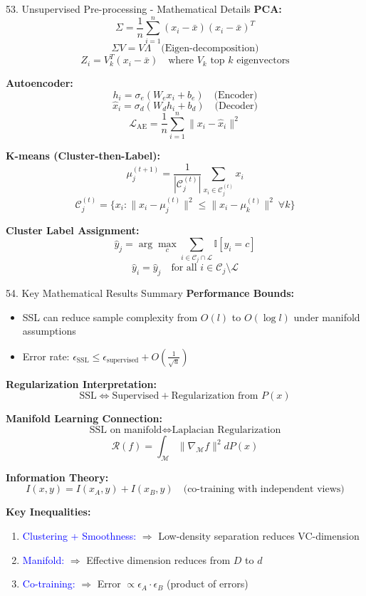 \documentclass[8pt]{beamer}
\begin{document}
	\begin{frame}{53. Unsupervised Pre-processing - Mathematical Details}
		\fontsize{6.5}{7.5}\selectfont
		\textbf{PCA:}
		\[
		\Sigma = \frac{1}{n} \sum_{i=1}^n (x_i - \bar{x})(x_i - \bar{x})^T
		\]
		\[
		\Sigma V = V \Lambda \quad \text{(Eigen-decomposition)}
		\]
		\[
		Z_i = V_k^T (x_i - \bar{x}) \quad \text{where } V_k \text{ top } k \text{ eigenvectors}
		\]
		
		\textbf{Autoencoder:}
		\[
		h_i = \sigma_e(W_e x_i + b_e) \quad \text{(Encoder)}
		\]
		\[
		\hat{x}_i = \sigma_d(W_d h_i + b_d) \quad \text{(Decoder)}
		\]
		\[
		\mathcal{L}_{\text{AE}} = \frac{1}{n} \sum_{i=1}^n \|x_i - \hat{x}_i\|^2
		\]
		
		\textbf{K-means (Cluster-then-Label):}
		\[
		\mu_j^{(t+1)} = \frac{1}{|\mathcal{C}_j^{(t)}|} \sum_{x_i \in \mathcal{C}_j^{(t)}} x_i
		\]
		\[
		\mathcal{C}_j^{(t)} = \{x_i : \|x_i - \mu_j^{(t)}\|^2 \leq \|x_i - \mu_k^{(t)}\|^2 \ \forall k\}
		\]
		
		\textbf{Cluster Label Assignment:}
		\[
		\hat{y}_j = \arg\max_c \sum_{i \in \mathcal{C}_j \cap \mathcal{L}} \mathbb{I}[y_i = c]
		\]
		\[
		\hat{y}_i = \hat{y}_j \quad \text{for all } i \in \mathcal{C}_j \setminus \mathcal{L}
		\]
	\end{frame}
	
	\begin{frame}{54. Key Mathematical Results Summary}
		\fontsize{6.5}{7.5}\selectfont
		\textbf{Performance Bounds:}
		\begin{itemize}
			\item SSL can reduce sample complexity from $O(l)$ to $O(\log l)$ under manifold assumptions
			\item Error rate: $\epsilon_{\text{SSL}} \leq \epsilon_{\text{supervised}} + O\left(\frac{1}{\sqrt{u}}\right)$
		\end{itemize}
		
		\textbf{Regularization Interpretation:}
		\[
		\text{SSL} \iff \text{Supervised} + \text{Regularization from } P(x)
		\]
		
		\textbf{Manifold Learning Connection:}
		\[
		\text{SSL on manifold} \iff \text{Laplacian Regularization}
		\]
		\[
		\mathcal{R}(f) = \int_{\mathcal{M}} \|\nabla_{\mathcal{M}} f\|^2 dP(x)
		\]
		
		\textbf{Information Theory:}
		\[
		I(x, y) = I(x_A, y) + I(x_B, y) \quad \text{(co-training with independent views)}
		\]
		
		\textbf{Key Inequalities:}
		\begin{enumerate}
			\item \textcolor{blue}{Clustering + Smoothness:} $\Rightarrow$ Low-density separation reduces VC-dimension
			\item \textcolor{blue}{Manifold:} $\Rightarrow$ Effective dimension reduces from $D$ to $d$
			\item \textcolor{blue}{Co-training:} $\Rightarrow$ Error $\propto \epsilon_A \cdot \epsilon_B$ (product of errors)
		\end{enumerate}
	\end{frame}
	
\end{document}
